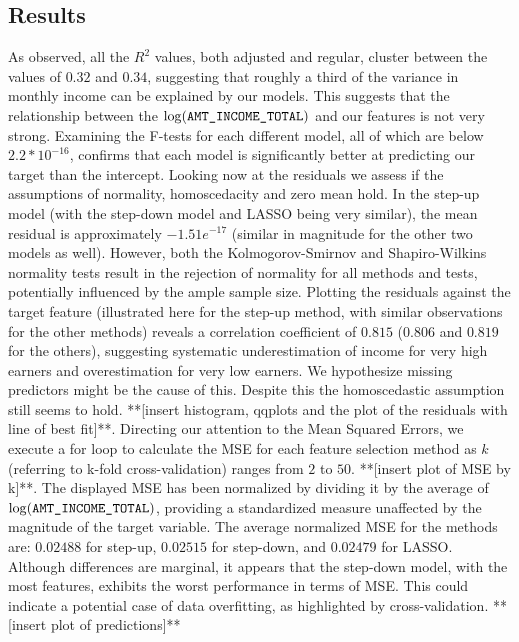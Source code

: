 \documentclass[12pt]{article}
\begin{document}
\subsection{Results}
As observed, all the $R^2$ values, both adjusted and regular, cluster between the values of $0.32$ and $0.34$, suggesting that roughly a third of the variance in monthly income can be explained by our models. This suggests that the relationship between the $\log(\verb|AMT_INCOME_TOTAL|)$ and our features is not very strong. Examining the F-tests for each different model, all of which are below $2.2*10^{-16}$, confirms that each model is significantly better at predicting our target than the intercept. Looking now at the residuals we assess if the assumptions of normality, homoscedacity and zero mean hold. In the step-up model (with the step-down model and LASSO being very similar), the mean residual is approximately $-1.51e^{-17}$ (similar in magnitude for the other two models as well). However, both the Kolmogorov-Smirnov and Shapiro-Wilkins normality tests result in the rejection of normality for all methods and tests, potentially influenced by the ample sample size. Plotting the residuals against the target feature (illustrated here for the step-up method, with similar observations for the other methods) reveals a correlation coefficient of $0.815$ ($0.806$ and $0.819$ for the others), suggesting systematic underestimation of income for very high earners and overestimation for very low earners. We hypothesize missing predictors might be the cause of this. Despite this the homoscedastic assumption still seems to hold. **[insert histogram, qqplots and the plot of the residuals with line of best fit]**. Directing our attention to the Mean Squared Errors, we execute a for loop to calculate the MSE for each feature selection method as $k$ (referring to k-fold cross-validation) ranges from $2$ to $50$. **[insert plot of MSE by k]**. The displayed MSE has been normalized by dividing it by the average of $\log(\verb|AMT_INCOME_TOTAL|)$, providing a standardized measure unaffected by the magnitude of the target variable. The average normalized MSE for the methods are: $0.02488$ for step-up, $0.02515$ for step-down, and $0.02479$ for LASSO. Although differences are marginal, it appears that the step-down model, with the most features, exhibits the worst performance in terms of MSE. This could indicate a potential case of data overfitting, as highlighted by cross-validation. **[insert plot of predictions]**
\end{document}
